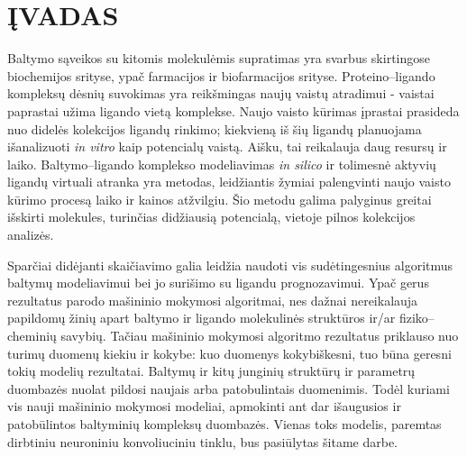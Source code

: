 

\usepackage{newtxmath}
\usepackage[style=dutch]{csquotes}
\newcommand{\angstrom}{\textup{\AA}}
\def\UrlBreaks{\do\/\do-}






\tableofcontents
\pagebreak


\section*{ĮVADAS}

Baltymo sąveikos su kitomis molekulėmis supratimas yra svarbus skirtingose biochemijos srityse, ypač farmacijos ir biofarmacijos srityse.\cite{hochuli_visualizing_2018}\cite{sethi_molecular_2019} Proteino--ligando kompleksų dėsnių suvokimas yra reikšmingas naujų vaistų atradimui - vaistai paprastai užima ligando vietą komplekse. Naujo vaisto kūrimas įprastai prasideda nuo didelės kolekcijos ligandų rinkimo; kiekvieną iš šių ligandų planuojama išanalizuoti \textit{in vitro} kaip potencialų vaistą. Aišku, tai reikalauja daug resursų ir laiko. Baltymo--ligando komplekso modeliavimas \textit{in silico} ir tolimesnė aktyvių ligandų virtuali atranka yra metodas, leidžiantis žymiai palengvinti naujo vaisto kūrimo procesą laiko ir kainos atžvilgiu. Šio metodu galima palyginus greitai išskirti molekules, turinčias didžiausią potencialą, vietoje pilnos kolekcijos analizės. \cite{berry_practical_2015}\cite{sethi_molecular_2019}

Sparčiai didėjanti skaičiavimo galia leidžia naudoti vis sudėtingesnius algoritmus baltymų modeliavimui bei jo surišimo su ligandu prognozavimui. Ypač gerus rezultatus parodo mašininio mokymosi algoritmai, nes dažnai nereikalauja papildomų žinių apart baltymo ir ligando molekulinės struktūros ir/ar fiziko--cheminių savybių. Tačiau mašininio mokymosi algoritmo rezultatus priklauso nuo turimų duomenų kiekiu ir kokybe: kuo duomenys kokybiškesni, tuo būna geresni tokių modelių rezultatai. Baltymų ir kitų junginių struktūrų ir parametrų duombazės nuolat pildosi naujais arba patobulintais duomenimis. Todėl kuriami vis nauji mašininio mokymosi modeliai, apmokinti ant dar išaugusios ir patobūlintos baltyminių kompleksų duombazės.\cite{meng_molecular_2011} Vienas toks modelis, paremtas dirbtiniu neuroniniu konvoliuciniu tinklu, bus pasiūlytas šitame darbe.

